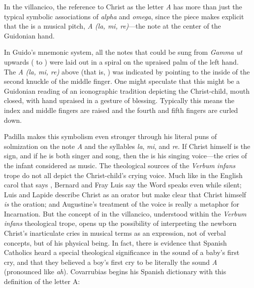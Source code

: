 In the villancico, the reference to Christ as the letter \emph{A} has more than
just the typical symbolic associations of \emph{alpha} and \emph{omega}, since
the piece makes explicit that the  is a musical pitch, \emph{A (la,
mi, re)}---the note at the center of the Guidonian hand.%
\begin{Footnote}
    In Guido's mnemonic system, all the notes that could be sung from
    \emph{Gamma ut} upwards ( to ) were laid out in a
    spiral on the upraised palm of the left hand.
    The \emph{A (la, mi, re)} above  (that is, )
    was indicated by pointing to the inside of the second knuckle of the middle
    finger.
    One might speculate that this might be a Guidonian reading of an
    iconographic tradition depicting the Christ-child, mouth closed, with hand
    upraised in a gesture of blessing.
    Typically this means the index and middle fingers are raised and the fourth
    and fifth fingers are curled down.
\end{Footnote}
Padilla makes this symbolism even stronger through his literal puns of
solmization on the note \emph{A} and the syllables \emph{la}, \emph{mi}, and
\emph{re}.
If Christ himself is the sign, and if he is both singer and song, then the
 is his singing voice---the cries of the infant considered as
music.
The theological sources of the \emph{Verbum infans} trope do not all depict the
Christ-child's crying voice.
Much like in the English carol that says , Bernard and Fray Luis say the Word speaks even while silent; Luis and
Lapide describe Christ as an orator but make clear that Christ himself \emph{is}
the oration; and Augustine's treatment of the voice is really a metaphor for
Incarnation.
But the concept of  in the villancico, understood within
the \emph{Verbum infans} theological trope, opens up the possibility of
interpreting the newborn Christ's inarticulate cries in musical terms as an
expression, not of verbal concepts, but of his physical being.
In fact, there is evidence that Spanish Catholics heard a special theological
significance in the sound of a baby's first cry, and that they believed a boy's
first cry to be literally the sound \emph{A} (pronounced like \emph{ah}).
Covarrubias begins his Spanish dictionary with this definition of the letter A:
